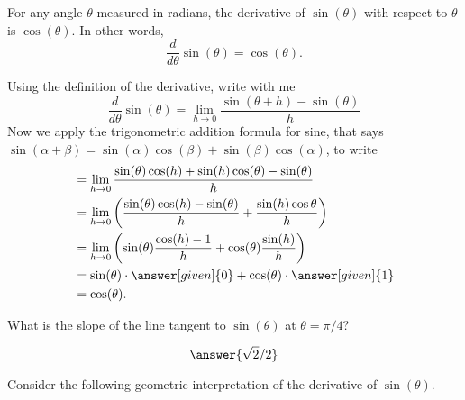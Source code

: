 \documentclass{ximera}
\begin{document}
\begin{theorem}\label{theorem:deriv sin}
For any angle $\theta$ measured in radians, the derivative of $\sin(\theta)$ with respect to $\theta$ is $\cos(\theta)$.  In other words, 
\[
\frac{d}{d\theta} \sin(\theta) = \cos(\theta).
\]
\begin{explanation}
Using the definition of the derivative, write with me
\[
  \frac{d}{d\theta} \sin(\theta) = \lim_{h\to0} \frac{\sin(\theta+h)-\sin(\theta)}{h}
\]
Now we apply the trigonometric addition formula for sine, that says $\sin(\alpha+\beta) = \sin(\alpha)\cos(\beta)+\sin(\beta)\cos(\alpha)$, to write
\begin{align*}
  &= \lim_{h\to0} \frac{\sin(\theta)\cos(h)+\sin(h)\cos(\theta)-\sin(\theta)}{h}  \\
  &= \lim_{h\to0} \left(\frac{\sin(\theta)\cos(h)-\sin(\theta)}{h} + \frac{\sin(h)\cos{\theta}}{h} \right)\\
  &=\lim_{h\to0} \left(\sin (\theta)\frac{\cos(h) - 1}{h}+\cos(\theta)\frac{\sin(h)}{h}\right) \\
  &=\sin(\theta) \cdot \answer[given]{0} + \cos(\theta) \cdot \answer[given]{1}\\
  &= \cos(\theta). 
\end{align*}
\end{explanation}
\end{theorem}

\begin{question}
  What is the slope of the line tangent to $\sin(\theta)$ at $\theta =
  \pi/4$?
  \begin{prompt}
    \[
    \answer{\sqrt{2}/2}
    \]
  \end{prompt}
\end{question}

Consider the following geometric
interpretation of the derivative of $\sin(\theta)$.
\end{document}

